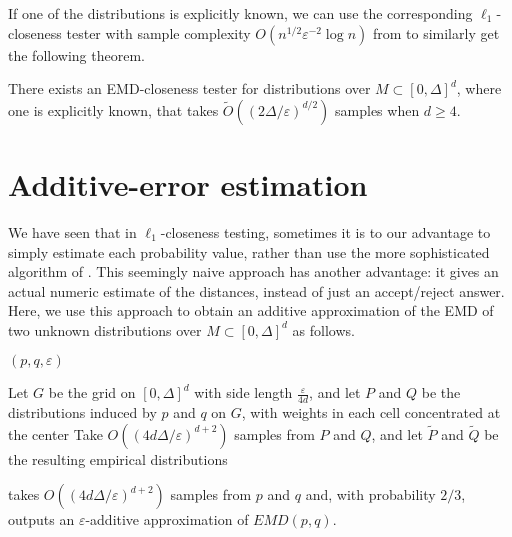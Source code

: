 \documentclass[11pt]{article}
\newcommand{\eps}{\varepsilon}
\begin{document}
If one of the distributions is explicitly known, we can use the corresponding $\ell_1$-closeness
tester with sample complexity $O(n^{1/2}\eps^{-2}\log n)$ from \cite{L1indep} to
similarly get the following theorem.

\begin{theorem}
	There exists an EMD-closeness tester for distributions over $M \subset [0,\Delta]^d$,
	where one is explicitly known, that takes $\tilde{O}((2\Delta/\eps)^{d/2})$ samples
	when $d\ge4$.
\end{theorem}

\section{Additive-error estimation}

We have seen that in $\ell_1$-closeness testing, sometimes it is to our advantage to
simply estimate each probability value, rather than use the more sophisticated
algorithm of \cite{L1tester}. This seemingly naive approach has another advantage:
it gives an actual numeric estimate of the distances, instead of just an
accept/reject answer. Here, we use this approach to obtain an additive approximation
of the EMD of two unknown distributions over $M \subset [0,\Delta]^d$ as follows.

$(p,q,\eps)$\\
\begin{algorithm}[H]
	Let $G$ be the grid on $[0,\Delta]^d$ with side length $\frac{\eps}{4d}$,
		and let $P$ and $Q$ be the distributions induced by $p$ and $q$ on $G$, with
		weights in each cell concentrated at the center\;
	Take $O((4d\Delta/\eps)^{d+2})$ samples from $P$ and $Q$, and let $\tilde{P}$
		and $\tilde{Q}$ be the resulting empirical distributions\;
\end{algorithm}

\begin{theorem}
	 takes $O((4d\Delta/\eps)^{d+2})$ samples from $p$ and
	$q$ and, with probability $2/3$, outputs an $\eps$-additive approximation of $EMD(p,q)$.
\end{theorem}
\end{document}
